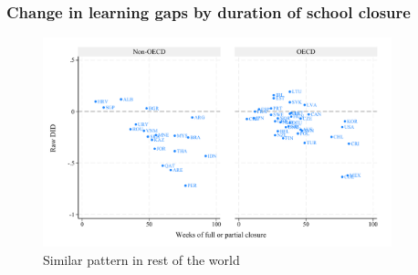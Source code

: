 \documentclass{beamer}
\begin{document}
\begin{frame}
    \label{frame:pisaclosure}
    \frametitle{Change in learning gaps by duration of school closure}
    
    \begin{figure}
        \centering
        \includegraphics[width=0.9\textwidth]{./FIGURES/Descriptive/PISA_raw_DID_PV4MATH_not_fully_open.pdf}
        \caption{Similar pattern in rest of the world}
        \label{fig:1b}
    \end{figure}
    
    
\end{frame}
\end{document}
